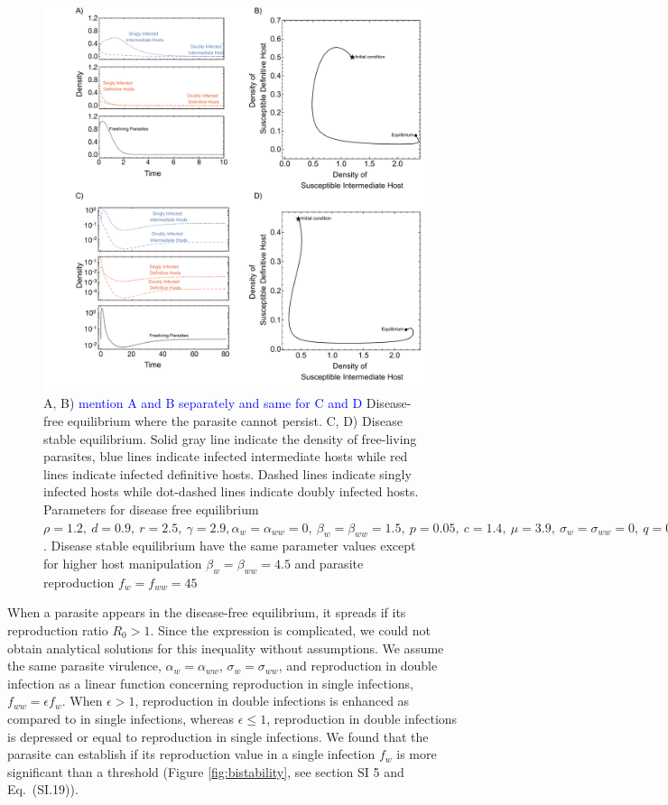 \documentclass[a4paper]{scrartcl}
\newcommand{\cha}[1]{\textcolor{blue}{#1}}
\begin{document}
\begin{figure}[!ht]
\captionsetup{format=plain}
\includegraphics[width=\textwidth]{Figures/ecotraject_nonlinear.pdf}
\caption{A, B) \cha{mention A and B separately and same for C and D} Disease-free equilibrium where the parasite cannot persist. C, D) Disease stable equilibrium. Solid gray line indicate the density of free-living parasites, blue lines indicate infected intermediate hosts while red lines indicate infected definitive hosts. Dashed lines indicate singly infected hosts while dot-dashed lines indicate doubly infected hosts. Parameters for disease free equilibrium $\rho =  1.2, \ d = 0.9, \  r = 2.5, \ \gamma =  2.9, \alpha_w = \alpha_{ww} =  0, \ \beta_w = \beta_{ww} = 1.5, \ p = 0.05, \  c = 1.4, \ \mu = 3.9, \ \sigma_w = \sigma_{ww} = 0, \ q = 0.05, \ f_w = f_{ww} = 7.5, \ \delta = 0.9, \ k = 0.26, \ h = 0.6$. Disease stable equilibrium have the same parameter values except for higher host manipulation $ \beta_w =  \beta_{ww} = 4.5$ and parasite reproduction $ f_w  = f_{ww} = 45$}
\label{fig:ecotraject:nonlinear}
\end{figure}

When a parasite appears in the disease-free equilibrium, it spreads if its reproduction ratio $R_0 > 1$. 
Since the expression is complicated, we could not obtain analytical solutions for this inequality without assumptions. 
We assume the same parasite virulence, $\alpha_w = \alpha_{ww}$, $\sigma_w = \sigma_{ww}$, and reproduction in double infection as a linear function concerning reproduction in single infections, $f_{ww} = \epsilon f_w$. 
When $\epsilon > 1$, reproduction in double infections is enhanced as compared to in single infections, whereas $\epsilon \leq 1$, reproduction in double infections is depressed or equal to reproduction in single infections.
We found that the parasite can establish if its reproduction value in a single infection $f_w$ is more significant than a threshold (Figure \ref{fig:bistability}, see section SI 5 and Eq.~(SI.19)). 
\end{document}
